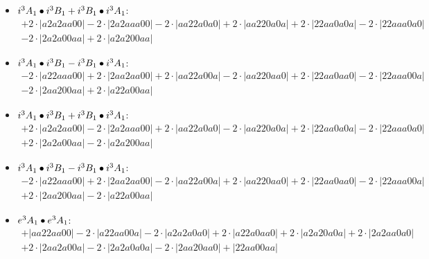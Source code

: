 \documentclass{article}
\begin{document}
\begin{itemize}
$$\begin{array}{c}
\end{array}$$
\item \boldmath$i^3 A_1 \bullet i^3 B_{1} + i^3 B_{1} \bullet i^3 A_1 \displaystyle $\unboldmath : \quad$$\begin{array}{c}
+2 \cdot \left|a2a2aa00\right| -2 \cdot \left|2a2aaa00\right| -2 \cdot \left|aa22a0a0\right| +2 \cdot \left|aa220a0a\right| +2 \cdot \left|22aa0a0a\right| -2 \cdot \left|22aaa0a0\right| \\[0.5cm] -2 \cdot \left|2a2a00aa\right| +2 \cdot \left|a2a200aa\right|
\end{array}$$
\item \boldmath$i^3 A_1 \bullet i^3 B_{1} - i^3 B_{1} \bullet i^3 A_1 \displaystyle $\unboldmath : \quad$$\begin{array}{c}
-2 \cdot \left|a22aaa00\right| +2 \cdot \left|2aa2aa00\right| +2 \cdot \left|aa22a00a\right| -2 \cdot \left|aa220aa0\right| +2 \cdot \left|22aa0aa0\right| -2 \cdot \left|22aaa00a\right| \\[0.5cm] -2 \cdot \left|2aa200aa\right| +2 \cdot \left|a22a00aa\right|
\end{array}$$
\item \boldmath$i^3 A_1 \bullet i^3 B_{1} + i^3 B_{1} \bullet i^3 A_1 \displaystyle $\unboldmath : \quad$$\begin{array}{c}
+2 \cdot \left|a2a2aa00\right| -2 \cdot \left|2a2aaa00\right| +2 \cdot \left|aa22a0a0\right| -2 \cdot \left|aa220a0a\right| +2 \cdot \left|22aa0a0a\right| -2 \cdot \left|22aaa0a0\right| \\[0.5cm] +2 \cdot \left|2a2a00aa\right| -2 \cdot \left|a2a200aa\right|
\end{array}$$
\item \boldmath$i^3 A_1 \bullet i^3 B_{1} - i^3 B_{1} \bullet i^3 A_1 \displaystyle $\unboldmath : \quad$$\begin{array}{c}
-2 \cdot \left|a22aaa00\right| +2 \cdot \left|2aa2aa00\right| -2 \cdot \left|aa22a00a\right| +2 \cdot \left|aa220aa0\right| +2 \cdot \left|22aa0aa0\right| -2 \cdot \left|22aaa00a\right| \\[0.5cm] +2 \cdot \left|2aa200aa\right| -2 \cdot \left|a22a00aa\right|
\end{array}$$
\item \boldmath$e^3 A_1 \bullet e^3 A_1 \displaystyle $\unboldmath : \quad$$\begin{array}{c}
+\left|aa22aa00\right| -2 \cdot \left|a22aa00a\right| -2 \cdot \left|a2a2a0a0\right| +2 \cdot \left|a22a0aa0\right| +2 \cdot \left|a2a20a0a\right| +2 \cdot \left|2a2aa0a0\right| \\[0.5cm] +2 \cdot \left|2aa2a00a\right| -2 \cdot \left|2a2a0a0a\right| -2 \cdot \left|2aa20aa0\right| +\left|22aa00aa\right|

\end{array}$$
\end{itemize}
\end{document}
